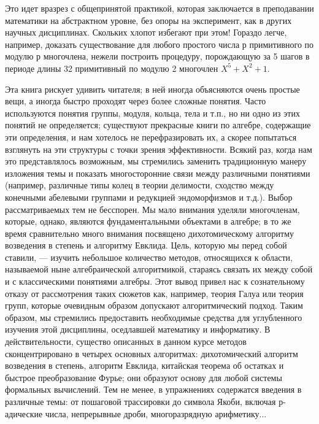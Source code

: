 {{   Это идет вразрез с общепринятой практикой, которая заключается в преподавании математики на абстрактном уровне, без опоры на эксперимент, как в других научных дисциплинах. Скольких хлопот избегают при этом! Гораздо легче, например, доказать существование для любого простого числа р примитивного по модулю р многочлена, нежели построить процедуру, порождающую за 5 шагов в периоде длины 32 примитивный по модулю 2 многочлен $X^5 + X^2 + 1$.

   Эта книга рискует удивить читателя; в ней иногда объясняются очень простые вещи, а иногда быстро проходят через более сложные понятия. Часто используются понятия группы, модуля, кольца, тела и т.п., но ни одно из этих понятий не определяется; существуют прекрасные книги по алгебре, содержащие эти определения, и нам хотелось не перефразировать их, а скорее попытаться взглянуть на эти структуры с точки зрения эффективности. Всякий раз, когда нам это представлялось возможным, мы стремились заменить традиционную манеру изложения темы и показать многосторонние связи между различными понятиями (например, различные типы колец в теории делимости, сходство между конечными абелевыми группами и редукцией эндоморфизмов и т.д.). Выбор рассматриваемых тем не бесспорен. Мы мало внимания уделяли многочленам, которые, однако, являются фундаментальными объектами в алгебре; в то же время сравнительно много внимания посвящено дихотомическому алгоритму возведения в степень и алгоритму Евклида. Цель, которую мы перед собой ставили, — изучить небольшое количество методов, относящихся к области, называемой ныне алгебраической алгоритмикой, стараясь связать их между собой и с классическими понятиями алгебры. Этот вывод привел нас к сознательному отказу от рассмотрения таких сюжетов как, например,
\pagebreak
теория Галуа или теория групп, которые очевидным образом допускают алгоритмический подход. Таким образом, мы стремились предоставить необходимые средства для углубленного изучения этой дисциплины, оседлавшей математику и информатику. В действительности, существо описанных в данном курсе методов сконцентрировано в четырех основных алгоритмах: дихотомический алгоритм возведения в степень, алгоритм Евклида, китайская теорема об остатках и быстрое преобразование Фурье; они образуют основу для любой системы формальных вычислений. Тем не менее, в упражнениях содержатся введения в различные темы: от пошаговой трассировки до символа Якоби, включая р-адические числа, непрерывные дроби, многоразрядную арифметику...

}}
